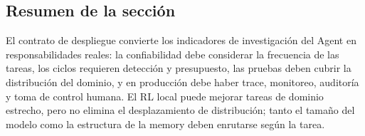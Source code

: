 \subsection{Resumen de la sección}

El contrato de despliegue convierte los indicadores de investigación del Agent en responsabilidades reales: la confiabilidad debe considerar la frecuencia de las tareas, los ciclos requieren detección y presupuesto, las pruebas deben cubrir la distribución del dominio, y en producción debe haber trace, monitoreo, auditoría y toma de control humana. El RL local puede mejorar tareas de dominio estrecho, pero no elimina el desplazamiento de distribución; tanto el tamaño del modelo como la estructura de la memory deben enrutarse según la tarea.
